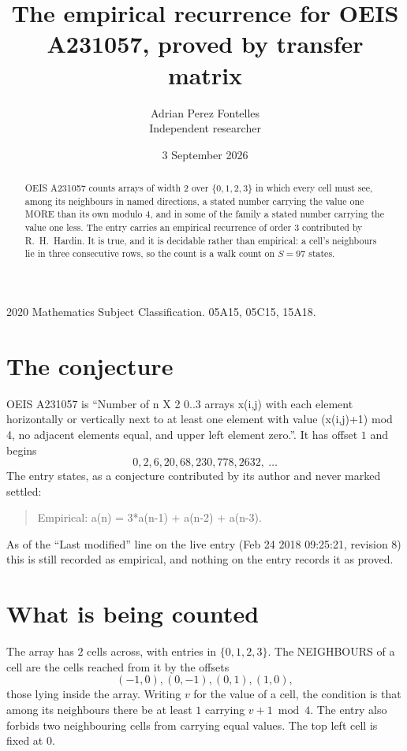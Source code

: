 \documentclass[11pt,a4paper]{article}
\title{The empirical recurrence for OEIS A231057, proved by transfer matrix}
\author{Adrian Perez Fontelles\\ \small Independent researcher}
\date{3 September 2026}
\theoremstyle{plain}
\theoremstyle{definition}
\begin{document}
\maketitle

\begin{abstract}
OEIS A231057 counts arrays of width $2$ over $\{0,1,2,3\}$ in which every cell must see, among its
neighbours in named directions, a stated number carrying the value one MORE than its own
modulo $4$, and in some of the family a stated number carrying the value one less. The entry
carries an empirical recurrence of order $3$ contributed by R.~H.~Hardin. It is true, and
it is decidable rather than empirical: a cell's neighbours lie in three consecutive rows, so
the count is a walk count on $S=97$ states.
\end{abstract}

\noindent\small 2020 Mathematics Subject Classification. 05A15, 05C15, 15A18.\normalsize

\section{The conjecture}

OEIS A231057 is ``Number of n X 2 0..3 arrays x(i,j) with each element horizontally or vertically next to at least one element with value (x(i,j)+1) mod 4, no adjacent elements equal, and upper left element zero.''. It has offset $1$ and begins
\[
0, 2, 6, 20, 68, 230, 778, 2632,\ \dots
\]
The entry states, as a conjecture contributed by its author and never marked settled:
\begin{quote}
Empirical: a(n) = 3*a(n-1) + a(n-2) + a(n-3).
\end{quote}
As of the ``Last modified'' line on the live entry (Feb 24 2018 09:25:21, revision 8) this is still
recorded as empirical, and nothing on the entry records it as proved.

\section{What is being counted}

The array has $2$ cells across, with entries in $\{0,1,2,3\}$. The NEIGHBOURS of a cell are the
cells reached from it by the offsets
\[
(-1,0), (0,-1), (0,1), (1,0),
\]
those lying inside the array. Writing $v$ for the value of a cell, the condition is that among
its neighbours there be at least $1$ carrying $v+1 \bmod 4$. The entry also forbids two neighbouring cells from carrying equal values. The top left
cell is fixed at $0$.
\end{document}
